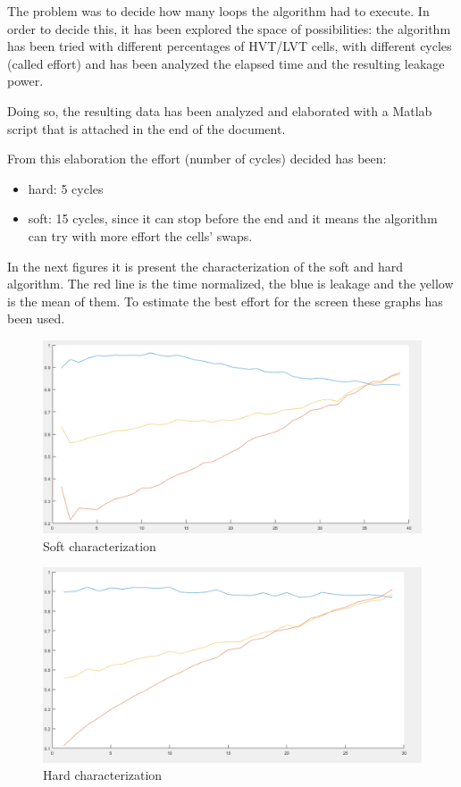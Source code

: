 \documentclass[10pt, english, oneside]{article}
\begin{document}
The problem was to decide how many loops the algorithm had to execute. In order
to decide this, it has been explored the space of possibilities: the algorithm
has been tried with different percentages of HVT/LVT cells, with different cycles
(called effort) and has been analyzed the elapsed time and the resulting leakage
power.

Doing so, the resulting data has been analyzed and elaborated with a Matlab
script that is attached in the end of the document.

From this elaboration the effort (number of cycles) decided has been:
\begin{itemize}
  \item hard: 5 cycles
  \item soft: 15 cycles, since it can stop before the end and it means the
    algorithm can try with more effort the cells' swaps.
\end{itemize}

In the next figures it is present the characterization of the soft and hard algorithm.
The red line is the time normalized, the blue is leakage and the yellow is the mean of them.
To estimate the best effort for the screen these graphs has been used.

\begin{figure}[hbt!]
	\centering
	\includegraphics[width=.5\textwidth]{soft.png}
	\caption{Soft characterization}
	\label{fig:soft}
\end{figure}

\begin{figure}[hbt!]
	\centering
	\includegraphics[width=.5\textwidth]{Hard.png}
	\caption{Hard characterization}
	\label{fig:soft}
\end{figure}
\end{document}
